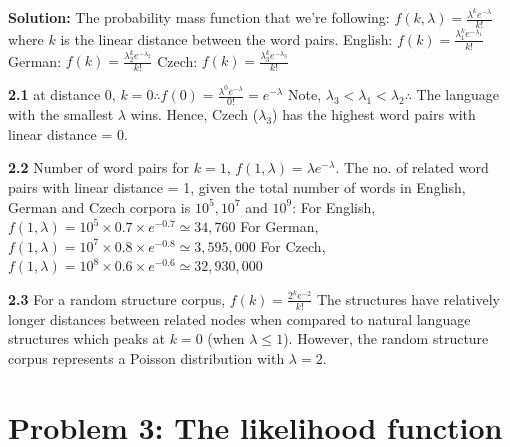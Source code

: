 \documentclass[11pt, letterpaper]{article}
\newenvironment{problem}[2][Problem]
    {\section*{#1 #2}}
    {}
\begin{document}
\textbf{Solution:} \newline
The probability mass function that we're following: $f(k, \lambda) = \frac{\lambda^{k}e^{-\lambda}}{k!}$ where $k$ is the linear distance between the word pairs. \newline
English: $f(k) = \frac{\lambda_{1}^{k}e^{-\lambda_{1}}}{k!}$ \newline
German: $f(k) = \frac{\lambda_{2}^{k}e^{-\lambda_{2}}}{k!}$ \newline
Czech: $f(k) = \frac{\lambda_{3}^{k}e^{-\lambda_{3}}}{k!}$ \newline

\textbf{2.1} at distance 0, $k=0 \therefore f(0) = \frac{\lambda^{0}e^{-\lambda}}{0!} = e^{-\lambda}$ \newline
Note, $\lambda_{3} < \lambda_{1} < \lambda_{2} \therefore$ The language with the smallest $\lambda$ wins. Hence, Czech ($\lambda_{3}$) has the highest word pairs with linear distance = 0. \newline

\textbf{2.2} Number of word pairs for $k=1$, $f(1, \lambda) = \lambda e^{-\lambda}$. \newline
The no. of related word pairs with linear distance = 1, given the total number of words in English, German and Czech corpora is $10^5, 10^7$ and $10^9$: \newline
For English, $f(1, \lambda) = 10^{5} \times 0.7 \times e^{-0.7} \simeq 34,760$ \newline
For German, $f(1, \lambda) = 10^{7} \times 0.8 \times e^{-0.8} \simeq 3,595,000$ \newline
For Czech, $f(1, \lambda) = 10^{8} \times 0.6 \times e^{-0.6} \simeq 32,930,000$ \newline

\textbf{2.3} For a random structure corpus, $f(k) = \frac{2^{k}e^{-2}}{k!}$ \newline
The structures have relatively longer distances between related nodes when compared to natural language structures which peaks at $k=0$ (when $\lambda \le 1$). However, the random structure corpus represents a Poisson distribution with $\lambda = 2$.
\newline
\vspace{3pt}

\newpage \begin{problem}{3: The likelihood function}
\end{problem}
\end{document}
